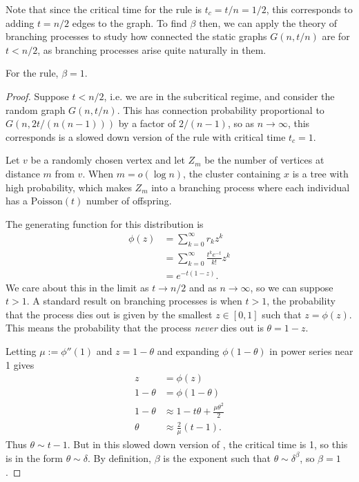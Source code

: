 \documentclass[twoside,10pt]{article}
\newcommand{\poisson}{\text{Poisson}}
\begin{document}
Note that since the critical time for the \ER rule is $t_c = t/n = 1/2$, this corresponds to adding $t=n/2$ edges to the graph. To find $\beta$ then, we can apply the theory of branching processes to study how connected the static graphs $G(n,t/n)$ are for $t < n/2$, as branching processes arise quite naturally in them.

\begin{thrm}[]
	\label{beta1}
	For the \ER rule, $\beta=1$.
\end{thrm}
\begin{proof}
	Suppose $t<n/2$, i.e. we are in the subcritical regime, and consider the \ER random graph $G(n,t/n)$. This has connection probability proportional to $G(n, 2t/(n (n-1)))$ by a factor of $2/(n-1)$, so as $n\to \infty$, this corresponds is a slowed down version of the \ER rule with critical time $t_{c}=1$.

	Let $v$ be a randomly chosen vertex and let $Z_{m}$ be the number of vertices at distance $m$ from $v$. When $m=o(\log n)$, the cluster containing $x$ is a tree with high probability, which makes $Z_{m}$ into a branching process where each individual has a $\poisson(t)$ number of offspring.

	The generating function for this distribution is
	\begin{align*}
		\phi(z) &= \sum_{k=0}^{\infty} r_{k}z^{k} \\
			&= \sum_{k=0}^{\infty} \frac{t^{k} e^{-t}}{k!} z^{k} \\
			&= e^{-t(1-z)}.
	\end{align*}
	We care about this in the limit as $t\to n/2$ and as $n\to \infty$, so we can suppose $t>1$. A standard result on branching processes is when $t>1$, the probability that the process dies out is given by the smallest $z \in [0,1]$ such that $z = \phi(z)$. This means the probability that the process \textit{never} dies out is $\theta = 1-z$.

	Letting $\mu := \phi''(1)$ and $z=1-\theta$ and expanding $\phi(1-\theta)$ in power series near 1 gives
	\begin{align*}
		z &= \phi(z) \\
		1-\theta &= \phi(1-\theta) \\
		1-\theta &\approx 1-t\theta + \frac{\mu\theta^{2}}{2} \\
		\theta &\approx \frac{2}{\mu} (t-1).
	\end{align*}
	Thus $\theta \sim t-1$. But in this slowed down version of \ER, the critical time is 1, so this is in the form $\theta \sim \delta$. By definition, $\beta$ is the exponent such that $\theta \sim \delta^{\beta}$, so $\beta=1$.
\end{proof}
\end{document}
